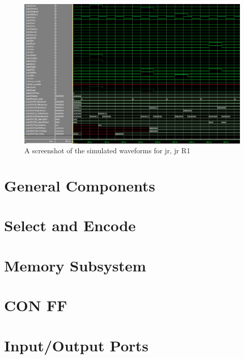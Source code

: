 \documentclass{article}
\begin{document}
        \begin{figure}[h!]
            \begin{center}
                \includegraphics[width=15cm]{jr_wave.png}
                \caption{A screenshot of the simulated waveforms for jr, jr R1}
            \end{center}
        \end{figure}


\appendix
\section{General Components}
     \label{datapath.v}
     \label{Bus.v}
     \label{register_zero.v}
\section{Select and Encode}
     \label{select_and_encode.v}
     \label{TB_select_and_encode.v}
\section{Memory Subsystem}
     \label{ram.v}
     \label{MAR.v}
     \label{MDR.v}
\section{CON FF}
     \label{con_ff.v}
     \label{ALU.v}
\section{Input/Output Ports}
     \label{inputPort.v}
     \label{outputPort.v}
    
\end{document}
